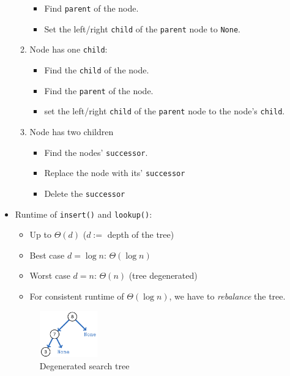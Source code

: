 \documentclass[12pt, a4paper]{scrartcl}
\begin{document}
\begin{itemize}
\begin{enumerate}
    \begin{itemize}
    \item Find \texttt{parent} of the node.
    \item Set the left/right \texttt{child} of the \texttt{parent} node to \texttt{None}.
    \end{itemize}
  \item Node has one \texttt{child}:
    \begin{itemize}
    \item Find the \texttt{child} of the node.
    \item Find the \texttt{parent} of the node.
    \item set the left/right \texttt{child} of the \texttt{parent} node to the node's \texttt{child}.
    \end{itemize}
  \item Node has two children
    \begin{itemize}
    \item Find the nodes' \texttt{successor}.
    \item Replace the node with its' \texttt{successor}
    \item Delete the \texttt{successor}
    \end{itemize}
\end{enumerate}
\item Runtime of \texttt{insert()} and \texttt{lookup()}:
  \begin{itemize}
  \item Up to $\Theta(d)$ ($d:=$ depth of the tree)
  \item Best case $d=\log n$: $\Theta(\log n)$
  \item Worst case $d=n$: $\Theta(n)$ (tree degenerated)
  \item For consistent runtime of $\Theta(\log n)$, we have to \emph{rebalance} the tree.
  \end{itemize}
  \begin{figure}[htbp]
    \centering
    \includegraphics[height=20mm]{search_tree_degenerated}
    \caption{Degenerated search tree}
  \end{figure}
\end{itemize}
\end{document}

